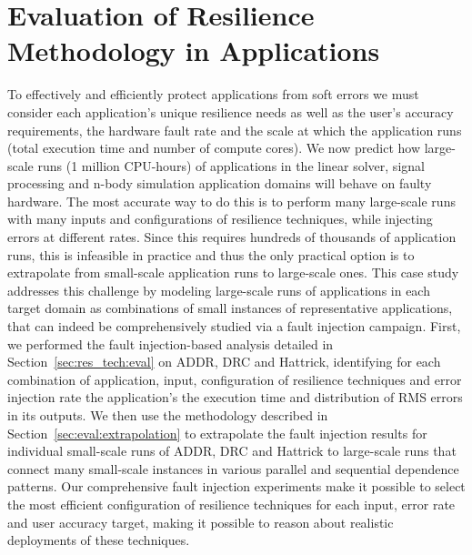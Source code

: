 \documentclass[10pt, conference, compsocconf]{IEEEtran}
\begin{document}
\section{Evaluation of Resilience Methodology in Applications}
\label{sec:eval}

To effectively and efficiently protect applications from soft errors we must consider each application's unique resilience needs as well as the user's accuracy requirements, the hardware fault rate and the scale at which the application runs (total execution time and number of compute cores).
We now predict how large-scale runs (1 million CPU-hours) of applications in the linear solver, signal processing and n-body simulation application domains will behave on faulty hardware.
The most accurate way to do this is to perform many large-scale runs with many inputs and configurations of resilience techniques, while injecting errors at different rates.
Since this requires hundreds of thousands of application runs, this is infeasible in practice and thus the only practical option is to extrapolate from small-scale application runs to large-scale ones.
This case study addresses this challenge by modeling large-scale runs of applications in each target domain as combinations of small instances of representative applications, that can indeed be comprehensively studied via a fault injection campaign. 
First, we performed the fault injection-based analysis detailed in Section~\ref{sec:res_tech:eval} on ADDR, DRC and Hattrick, identifying for each combination of application, input, configuration of resilience techniques and error injection rate the application's the execution time and distribution of RMS errors in its outputs.
We then use the methodology described in Section~\ref{sec:eval:extrapolation} to extrapolate the fault injection results for individual small-scale runs of ADDR, DRC and Hattrick to large-scale runs that connect many small-scale instances in various parallel and sequential dependence patterns.
Our comprehensive fault injection experiments make it possible to select the most efficient configuration of resilience techniques for each input, error rate and user accuracy target, making it possible to reason about realistic deployments of these techniques.
\end{document}
